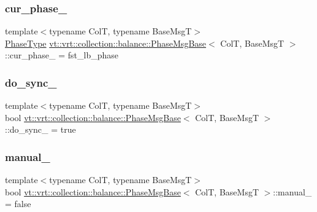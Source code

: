 \subsubsection{\texorpdfstring{cur\+\_\+phase\+\_\+}{cur\_phase\_}}
{\footnotesize\ttfamily template$<$typename ColT, typename Base\+MsgT$>$ \\
\hyperlink{namespacevt_a46ce6733d5cdbd735d561b7b4029f6d7}{Phase\+Type} \hyperlink{structvt_1_1vrt_1_1collection_1_1balance_1_1_phase_msg_base}{vt\+::vrt\+::collection\+::balance\+::\+Phase\+Msg\+Base}$<$ ColT, Base\+MsgT $>$\+::cur\+\_\+phase\+\_\+ = fst\+\_\+lb\+\_\+phase\hspace{0.3cm}{\ttfamily [private]}}

\mbox{\label{structvt_1_1vrt_1_1collection_1_1balance_1_1_phase_msg_base_aff1f6203ab4ed470d01395fa3e81387d}} 
\subsubsection{\texorpdfstring{do\+\_\+sync\+\_\+}{do\_sync\_}}
{\footnotesize\ttfamily template$<$typename ColT, typename Base\+MsgT$>$ \\
bool \hyperlink{structvt_1_1vrt_1_1collection_1_1balance_1_1_phase_msg_base}{vt\+::vrt\+::collection\+::balance\+::\+Phase\+Msg\+Base}$<$ ColT, Base\+MsgT $>$\+::do\+\_\+sync\+\_\+ = true\hspace{0.3cm}{\ttfamily [private]}}

\mbox{\label{structvt_1_1vrt_1_1collection_1_1balance_1_1_phase_msg_base_a4b217aa6869ec997270b373ca3786f72}} 
\subsubsection{\texorpdfstring{manual\+\_\+}{manual\_}}
{\footnotesize\ttfamily template$<$typename ColT, typename Base\+MsgT$>$ \\
bool \hyperlink{structvt_1_1vrt_1_1collection_1_1balance_1_1_phase_msg_base}{vt\+::vrt\+::collection\+::balance\+::\+Phase\+Msg\+Base}$<$ ColT, Base\+MsgT $>$\+::manual\+\_\+ = false\hspace{0.3cm}{\ttfamily [private]}}

